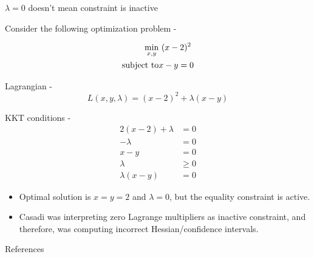 \documentclass[xcolor=dvipsnames, 8pt]{beamer} %
\begin{document}
\begin{frame}{$\lambda = 0$ doesn't mean constraint is inactive}
	
Consider the following optimization problem - 
	
\begin{align*}
\underset{x, y}{\textnormal{min}} & \ (x-2)^2 \\
\textnormal{subject to} & x-y = 0
\end{align*}

Lagrangian - 
\begin{equation*}
	L(x, y, \lambda) = (x-2)^2 + \lambda (x-y)
\end{equation*}

KKT conditions - 
\begin{align*}
	2(x-2) + \lambda &= 0 \\
	-\lambda &= 0 \\
	x - y &= 0 \\
	\lambda &\geq 0 \\
	\lambda(x-y) &= 0
\end{align*}

\begin{itemize}
	\item Optimal solution is $x=y=2$ and $\lambda = 0$, but the equality 
	constraint is active. 
	\item Casadi was interpreting zero Lagrange multipliers as inactive 
	constraint, and therefore, was computing incorrect Hessian/confidence 
	intervals.
\end{itemize}




\end{frame}	

\begin{frame}{References}


\end{frame}
\end{document}
